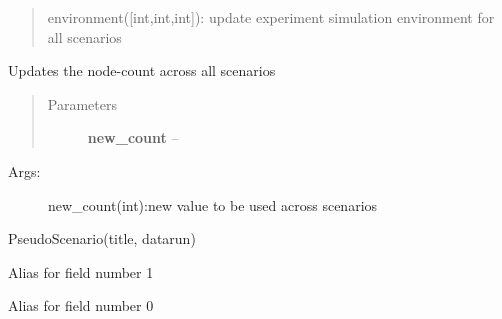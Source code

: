\documentclass[letterpaper,10pt,english]{sphinxmanual}
\begin{document}
\begin{fulllineitems}
\begin{fulllineitems}
\begin{quote}
environment({[}int,int,int{]}): update experiment simulation environment for all scenarios
\end{quote}

\end{fulllineitems}


\begin{fulllineitems}
\label{index:polybos.ExperimentManager.update_node_counts}
Updates the node-count across all scenarios
\begin{quote}\begin{description}
\item[{Parameters}] \leavevmode
\textbf{new\_count} -- 

\end{description}\end{quote}
\begin{description}
\item[{Args:}] \leavevmode
new\_count(int):new value to be used across scenarios

\end{description}

\end{fulllineitems}


\end{fulllineitems}


\begin{fulllineitems}
\label{index:polybos.PseudoScenario}
PseudoScenario(title, datarun)

\begin{fulllineitems}
\label{index:polybos.PseudoScenario.datarun}
Alias for field number 1

\end{fulllineitems}


\begin{fulllineitems}
\label{index:polybos.PseudoScenario.title}
Alias for field number 0

\end{fulllineitems}


\end{fulllineitems}
\end{document}
